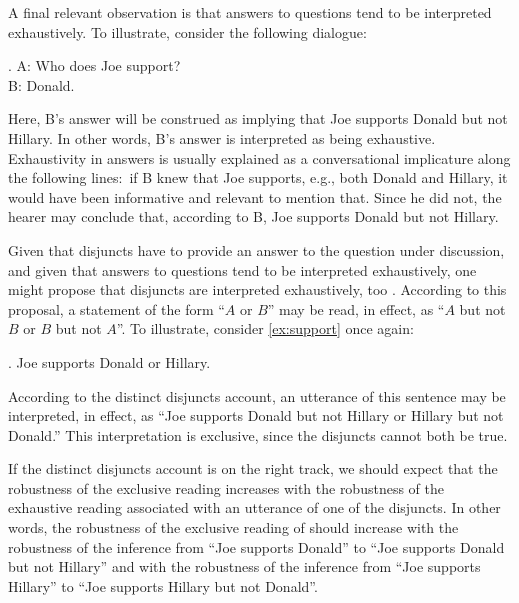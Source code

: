 \documentclass[12pt]{article}
\begin{document}
A final relevant observation is that answers to questions tend to be interpreted exhaustively. To illustrate, consider the following dialogue:

\ex.	A: Who does Joe support? \\ B: Donald.

Here, B's answer will be construed as implying that Joe supports Donald but not Hillary. In other words, B's answer is interpreted as being exhaustive. Exhaustivity in answers is usually explained as a conversational implicature along the following lines:\ if B knew that Joe supports, e.g., both Donald and Hillary, it would have been informative and relevant to mention that. Since he did not, the hearer may conclude that, according to B, Joe supports Donald but not Hillary.

Given that disjuncts have to provide an answer to the question under discussion, and given that answers to questions tend to be interpreted exhaustively, one might propose that disjuncts are interpreted exhaustively, too \citep{fox2007,ZimmermannFreeChoiceDisjunction2000}. According to this proposal, a statement of the form ``$A$ or $B$'' may be read, in effect, as ``$A$ but not $B$ or $B$ but not $A$''. To illustrate, consider \ref{ex:support} once again:

\ex.	Joe supports Donald or Hillary.

According to the distinct disjuncts account, an utterance of this sentence may be interpreted, in effect, as ``Joe supports Donald but not Hillary or Hillary but not Donald.'' This interpretation is exclusive, since the disjuncts cannot both be true.


If the distinct disjuncts account is on the right track, we should expect that the robustness of the exclusive reading increases with the robustness of the exhaustive reading associated with an utterance of one of the disjuncts. In other words, the robustness of the exclusive reading of \Last should increase with the robustness of the inference from ``Joe supports Donald'' to ``Joe supports Donald but not Hillary'' and with the robustness of the inference from ``Joe supports Hillary'' to ``Joe supports Hillary but not Donald''.
\end{document}
